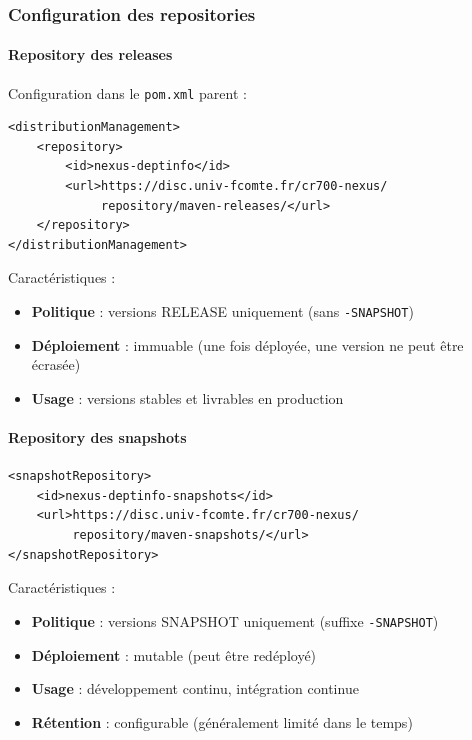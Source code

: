 \subsubsection{Configuration des repositories}

\paragraph{Repository des releases}

Configuration dans le \texttt{pom.xml} parent :
\vspace{0.3cm}
\begin{lstlisting}[language=enhancedxml, caption=Configuration du repository releases]
<distributionManagement>
    <repository>
        <id>nexus-deptinfo</id>
        <url>https://disc.univ-fcomte.fr/cr700-nexus/
             repository/maven-releases/</url>
    </repository>
</distributionManagement>
\end{lstlisting}

Caractéristiques :
\begin{itemize}
    \item \textbf{Politique} : versions RELEASE uniquement (sans \texttt{-SNAPSHOT})
    \item \textbf{Déploiement} : immuable (une fois déployée, une version ne peut être écrasée)
    \item \textbf{Usage} : versions stables et livrables en production
\end{itemize}

\paragraph{Repository des snapshots}

\vspace{0.3cm}
\begin{lstlisting}[language=enhancedxml, caption=Configuration du repository snapshots]
<snapshotRepository>
    <id>nexus-deptinfo-snapshots</id>
    <url>https://disc.univ-fcomte.fr/cr700-nexus/
         repository/maven-snapshots/</url>
</snapshotRepository>
\end{lstlisting}

Caractéristiques :
\begin{itemize}
    \item \textbf{Politique} : versions SNAPSHOT uniquement (suffixe \texttt{-SNAPSHOT})
    \item \textbf{Déploiement} : mutable (peut être redéployé)
    \item \textbf{Usage} : développement continu, intégration continue
    \item \textbf{Rétention} : configurable (généralement limité dans le temps)
\end{itemize}

